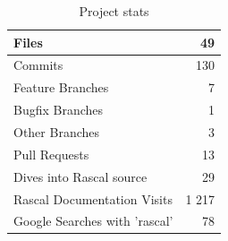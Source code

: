 \documentclass{article}
\begin{document}
\begin{table}[!htb]
\caption{Project stats}
\begin{tabular}{l|r}	
		\hline
		Files										&			49 \\
		\hline
		Commits										&			130 \\
		\hline
		Feature Branches							&			7 \\
		\hline
		Bugfix Branches								&			1 \\
		\hline
		Other Branches								&			3 \\
		\hline	
		Pull Requests								&			13 \\
		\hline	
		Dives into Rascal source					&			29 \\
		\hline		
		Rascal Documentation Visits					&			1 217 \\ %
		\hline		
		Google Searches with 'rascal'				&			78 \\	%
		\hline		
\end{tabular}
\end{table}
\end{document}
